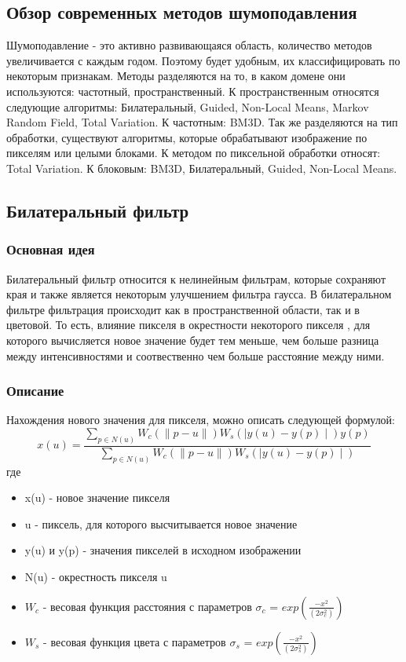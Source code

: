 
\subsection{Обзор современных методов шумоподавления}
Шумоподавление - это активно развивающаяся область, количество методов увеличивается с каждым годом. Поэтому будет удобным, их классифицировать по некоторым признакам. Методы разделяются на то, в каком домене они используются: частотный, пространственный.
К пространственным относятся следующие алгоритмы: Билатеральный, Guided, Non-Local Means, Markov Random Field, Total Variation.
К частотным: BM3D.
Так же разделяются на тип обработки, существуют алгоритмы, которые обрабатывают изображение по пикселям или целыми блоками.
К методом по пиксельной обработки относят: Total Variation.
К блоковым: BM3D, Билатеральный, Guided, Non-Local Means.
\subsection{Билатеральный фильтр}
\subsubsection{Основная идея}
Билатеральный фильтр относится к нелинейным фильтрам, которые сохраняют края и также является некоторым улучшением фильтра гаусса. В билатеральном фильтре фильтрация происходит как в пространственной области, так и в цветовой. То есть, влияние пикселя в окрестности некоторого пикселя , для которого вычисляется новое значение будет тем меньше, чем больше разница между интенсивностями и соотвественно чем больше расстояние между ними\cite{bilateral}.
\subsubsection{Описание}
Нахождения нового значения для пикселя, можно описать следующей формулой:
\begin{equation}
x(u) = \frac{\sum_{p\in N(u)}W_c(\parallel p - u\parallel)W_s(\mid y(u) - y(p)\mid)y(p)}
{\sum_{p\in N(u)}W_c(\parallel p - u\parallel)W_s(\mid y(u) - y(p)\mid)}
\end{equation}
где
\begin{itemize}
\item x(u) - новое значение пикселя
\item u - пиксель, для которого высчитывается новое значение
\item y(u) и y(p) - значения пикселей в исходном изображении
\item N(u) - окрестность пикселя u
\item $W_c$ - весовая функция расстояния с параметров $\sigma_c$ = $exp(\frac{-x^2}{(2\sigma_c^2)})$
\item $W_s$ - весовая функция цвета с параметров $\sigma_s$ = $exp(\frac{-x^2}{(2\sigma_s^2)})$
\end{itemize}

